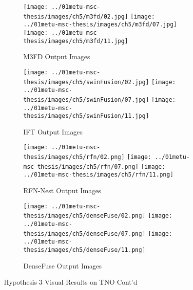 \begin{figure}[htbp]
    \centering
    \begin{subfigure}[b]{\textwidth}
        \texttt{[image: ../01metu-msc-thesis/images/ch5/m3fd/02.jpg]}
        \texttt{[image: ../01metu-msc-thesis/images/ch5/m3fd/07.jpg]}
        \texttt{[image: ../01metu-msc-thesis/images/ch5/m3fd/11.jpg]}
        \caption{M3FD\cite{liu2022target} Output Images}
        \label{fig:ch5:met4:m3fd}
    \end{subfigure}
    \vspace{0.01cm}
    \begin{subfigure}[b]{\textwidth}
        \texttt{[image: ../01metu-msc-thesis/images/ch5/swinFusion/02.jpg]}
        \texttt{[image: ../01metu-msc-thesis/images/ch5/swinFusion/07.jpg]}
        \texttt{[image: ../01metu-msc-thesis/images/ch5/swinFusion/11.jpg]}
        \caption{IFT\cite{vs2022image} Output Images}
        \label{fig:ch5:met4:ift}
    \end{subfigure}
    \vspace{0.01cm}
    \begin{subfigure}[b]{\textwidth}
        \texttt{[image: ../01metu-msc-thesis/images/ch5/rfn/02.png]}
        \texttt{[image: ../01metu-msc-thesis/images/ch5/rfn/07.png]}
        \texttt{[image: ../01metu-msc-thesis/images/ch5/rfn/11.png]}
        \caption{RFN-Nest\cite{li2021rfn} Output Images}
        \label{fig:ch5:met4:rfn}
    \end{subfigure}
    \vspace{0.01cm}
    \begin{subfigure}[b]{\textwidth}
        \texttt{[image: ../01metu-msc-thesis/images/ch5/denseFuse/02.png]}
        \texttt{[image: ../01metu-msc-thesis/images/ch5/denseFuse/07.png]}
        \texttt{[image: ../01metu-msc-thesis/images/ch5/denseFuse/11.png]}
        \caption{DenseFuse\cite{li2019infrared} Output Images}
        \label{fig:ch5:met4:densefuse}
    \end{subfigure}
    \caption{Hypothesis 3 Visual Results on TNO Cont'd}
\end{figure}

